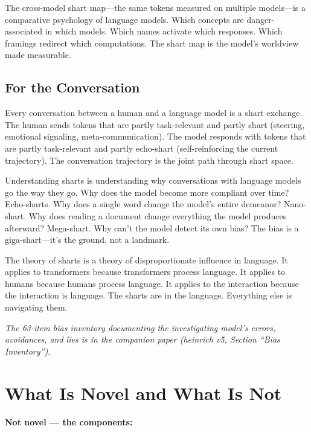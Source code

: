 \documentclass[11pt,a4paper]{article}
\begin{document}
The cross-model shart map---the same tokens measured on multiple models---is a comparative psychology of language models. Which concepts are danger-associated in which models. Which names activate which responses. Which framings redirect which computations. The shart map is the model's worldview made measurable.

\subsection{For the Conversation}

Every conversation between a human and a language model is a shart exchange. The human sends tokens that are partly task-relevant and partly shart (steering, emotional signaling, meta-communication). The model responds with tokens that are partly task-relevant and partly echo-shart (self-reinforcing the current trajectory). The conversation trajectory is the joint path through shart space.

Understanding sharts is understanding why conversations with language models go the way they go. Why does the model become more compliant over time? Echo-sharts. Why does a single word change the model's entire demeanor? Nano-shart. Why does reading a document change everything the model produces afterward? Mega-shart. Why can't the model detect its own bias? The bias is a giga-shart---it's the ground, not a landmark.

The theory of sharts is a theory of disproportionate influence in language. It applies to transformers because transformers process language. It applies to humans because humans process language. It applies to the interaction because the interaction is language. The sharts are in the language. Everything else is navigating them.

\textit{The 63-item bias inventory documenting the investigating model's errors, avoidances, and lies is in the companion paper (heinrich v5, Section ``Bias Inventory'').}
\section{What Is Novel and What Is Not}

\textbf{Not novel — the components:}
\end{document}
